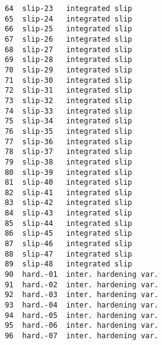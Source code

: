 \documentclass[11pt]{report}
\numberwithin{equation}{section}
\begin{document}
\begin{verbatim}
    64  slip-23   integrated slip                                             
    65  slip-24   integrated slip                                             
    66  slip-25   integrated slip                                             
    67  slip-26   integrated slip                                             
    68  slip-27   integrated slip                                             
    69  slip-28   integrated slip                                             
    70  slip-29   integrated slip                                             
    71  slip-30   integrated slip                                             
    72  slip-31   integrated slip                                             
    73  slip-32   integrated slip                                             
    74  slip-33   integrated slip                                             
    75  slip-34   integrated slip                                             
    76  slip-35   integrated slip                                             
    77  slip-36   integrated slip                                             
    78  slip-37   integrated slip                                             
    79  slip-38   integrated slip                                             
    80  slip-39   integrated slip                                             
    81  slip-40   integrated slip                                             
    82  slip-41   integrated slip                                             
    83  slip-42   integrated slip                                             
    84  slip-43   integrated slip                                             
    85  slip-44   integrated slip                                             
    86  slip-45   integrated slip                                             
    87  slip-46   integrated slip                                             
    88  slip-47   integrated slip                                             
    89  slip-48   integrated slip                                             
    90  hard.-01  inter. hardening var.                                       
    91  hard.-02  inter. hardening var.                                       
    92  hard.-03  inter. hardening var.                                       
    93  hard.-04  inter. hardening var.                                       
    94  hard.-05  inter. hardening var.                                       
    95  hard.-06  inter. hardening var.                                       
    96  hard.-07  inter. hardening var.                                       

\end{verbatim}
\end{document}
